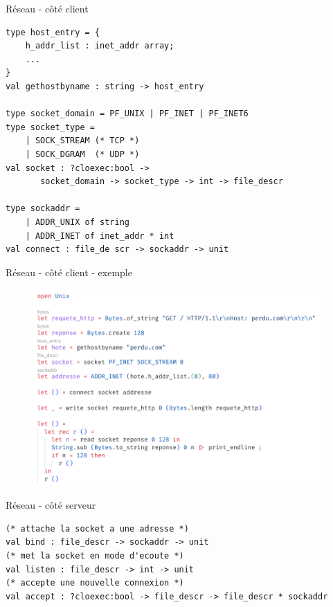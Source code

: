 
\begin{frame}[fragile]{Réseau - côté client}

\begin{lstlisting}
type host_entry = {
	h_addr_list : inet_addr array;
    ...
}
val gethostbyname : string -> host_entry

type socket_domain = PF_UNIX | PF_INET | PF_INET6
type socket_type =
    | SOCK_STREAM (* TCP *)
    | SOCK_DGRAM  (* UDP *)
val socket : ?cloexec:bool ->
       socket_domain -> socket_type -> int -> file_descr

type sockaddr =
    | ADDR_UNIX of string
    | ADDR_INET of inet_addr * int
val connect : file_de scr -> sockaddr -> unit
\end{lstlisting}

\end{frame}

\begin{frame}[fragile]{Réseau - côté client - exemple}

\begin{figure}
    \centering
    \includegraphics[width=\textwidth]{slides/images/unixsocket.png}
\end{figure}

\end{frame}

\begin{frame}[fragile]{Réseau - côté serveur}

\begin{lstlisting}
(* attache la socket a une adresse *)
val bind : file_descr -> sockaddr -> unit
(* met la socket en mode d'ecoute *)
val listen : file_descr -> int -> unit
(* accepte une nouvelle connexion *)
val accept : ?cloexec:bool -> file_descr -> file_descr * sockaddr
\end{lstlisting}

\end{frame}


